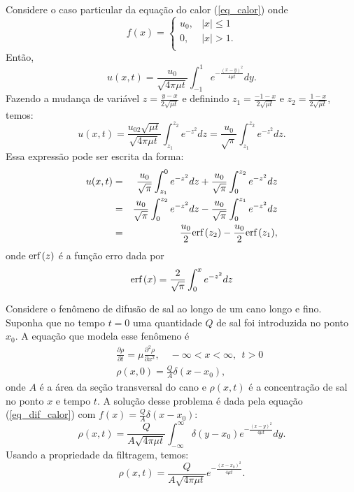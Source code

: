 \begin{ex}Considere o caso particular da equação do calor (\ref{eq_calor}) onde
$$
f(x)=\left\{\begin{array}{ll}
u_0,& |x|\leq 1\\
0,& |x|>1.\\
\end{array}\right.
$$
Então,
\begin{equation*}
u(x,t)=\frac{u_0}{\sqrt{4\pi \mu t}}\int_{-1}^1
e^{-\frac{(x-y)^2}{4\mu t}}dy.
\end{equation*}
Fazendo a mudança de variável $z=\frac{y-x}{2\sqrt{\mu t}}$ e definindo $z_1=\frac{-1-x}{2\sqrt{\mu t}}$ e $z_2=\frac{1-x}{2\sqrt{\mu t}}$, temos:
\begin{equation*}
u(x,t)=\frac{u_02\sqrt{\mu t}}{\sqrt{4\pi \mu t}}\int_{z_1}^{z_2}
e^{-z^2}dz=\frac{u_0}{\sqrt{\pi }}\int_{z_1}^{z_2}
e^{-z^2}dz.
\end{equation*}
Essa expressão pode ser escrita da forma:
\begin{eqnarray*}
u(x,t)&=&\frac{u_0}{\sqrt{\pi }}\int_{z_1}^{0}
e^{-z^2}dz+\frac{u_0}{\sqrt{\pi }}\int_{0}^{z_2}
e^{-z^2}dz\\
&=&\frac{u_0}{\sqrt{\pi }}\int_{0}^{z_2}
e^{-z^2}dz-\frac{u_0}{\sqrt{\pi }}\int_{0}^{z_1}
e^{-z^2}dz\\
&=&\frac{u_0}{2}\hbox{erf}\ \!(z_2)-\frac{u_0}{2}\hbox{erf}\ \!(z_1),
\end{eqnarray*}
onde $\hbox{erf}\ \!(z)$ é a função erro dada por
$$
\hbox{erf}\ \!(x)=\frac{2}{\sqrt{\pi }}\int_{0}^{x}
e^{-z^2}dz
$$
\end{ex}
\begin{ex}{\label{ex_eq_dif_2}}
Considere o fenômeno de difusão de sal ao longo de um cano longo e fino. Suponha que no tempo $t=0$ uma quantidade $Q$ de sal foi introduzida no ponto $x_0$. A equação que modela esse fenômeno é
\begin{eqnarray*}
&&\frac{\partial \rho}{\partial t}=\mu \frac{\partial^2
\rho}{\partial x^2},\quad -\infty<x<\infty,\ \ t>0\\
&&\rho(x,0)=\frac{Q}{A}\delta(x-x_0),
\end{eqnarray*}
onde $A$ é a área da seção transversal do cano e $\rho(x,t)$ é a concentração de sal no ponto $x$ e tempo $t$. A solução desse problema é dada pela equação (\ref{eq_dif_calor}) com $f(x)=\frac{Q}{A}\delta(x-x_0)$:
\begin{equation*}
\rho(x,t)=\frac{Q}{A\sqrt{4\pi \mu t}}\int_{-\infty}^\infty
\delta(y-x_0)e^{-\frac{(x-y)^2}{4\mu t}}dy.
\end{equation*}
Usando a propriedade da filtragem, temos:
\begin{equation*}
\rho(x,t)=\frac{Q}{A\sqrt{4\pi \mu t}}e^{-\frac{(x-x_0)^2}{4\mu t}}.
\end{equation*}


\end{ex}

